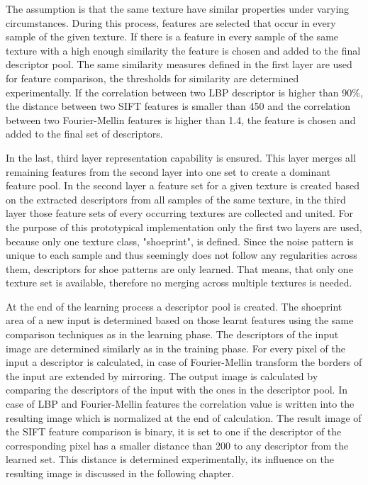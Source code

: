 \documentclass[draft,final]{vutinfth} %
\begin{document}
The assumption is that the same texture have similar properties under varying circumstances.
During this process, features are selected that occur in every sample of the given texture.
If there is a feature in every sample of the same texture with a high enough similarity the feature is chosen and added to the final descriptor pool.
The same similarity measures defined in the first layer are used for feature comparison, the thresholds for similarity are determined experimentally.
If the correlation between two LBP descriptor is higher than 90\%, the distance between two SIFT features is smaller than 450 and the correlation between two Fourier-Mellin features is higher than 1.4, the feature is chosen and added to the final set of descriptors.
\par
In the last, third layer representation capability is ensured.
This layer merges all remaining features from the second layer into one set to create a dominant feature pool.
In the second layer a feature set for a given texture is created based on the extracted descriptors from all samples of the same texture, in the third layer those feature sets of every occurring textures are collected and united.
For the purpose of this prototypical implementation only the first two layers are used, because only one texture class, "shoeprint", is defined.
Since the noise pattern is unique to each sample and thus seemingly does not follow any regularities across them, descriptors for shoe patterns are only learned.
That means, that only one texture set is available, therefore no merging across multiple textures is needed.
\par
At the end of the learning process a descriptor pool is created.
The shoeprint area of a new input is determined based on those learnt features using the same comparison techniques as in the learning phase.
The descriptors of the input image are determined similarly as in the training phase.
For every pixel of the input a descriptor is calculated, in case of Fourier-Mellin transform the borders of the input are extended by mirroring.
The output image is calculated by comparing the descriptors of the input with the ones in the descriptor pool.
In case of LBP and Fourier-Mellin features the correlation value is written into the resulting image which is normalized at the end of calculation.
The result image of the SIFT feature comparison is binary, it is set to one if the descriptor of the corresponding pixel has a smaller distance than 200 to any descriptor from the learned set.
This distance is determined experimentally, its influence on the resulting image is discussed in the following chapter.
\end{document}
